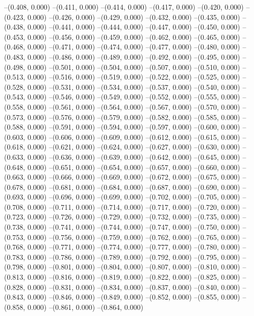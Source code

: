 {--(0.408, 0.000)
--(0.411, 0.000)
--(0.414, 0.000)
--(0.417, 0.000)
--(0.420, 0.000)
--(0.423, 0.000)
--(0.426, 0.000)
--(0.429, 0.000)
--(0.432, 0.000)
--(0.435, 0.000)
--(0.438, 0.000)
--(0.441, 0.000)
--(0.444, 0.000)
--(0.447, 0.000)
--(0.450, 0.000)
--(0.453, 0.000)
--(0.456, 0.000)
--(0.459, 0.000)
--(0.462, 0.000)
--(0.465, 0.000)
--(0.468, 0.000)
--(0.471, 0.000)
--(0.474, 0.000)
--(0.477, 0.000)
--(0.480, 0.000)
--(0.483, 0.000)
--(0.486, 0.000)
--(0.489, 0.000)
--(0.492, 0.000)
--(0.495, 0.000)
--(0.498, 0.000)
--(0.501, 0.000)
--(0.504, 0.000)
--(0.507, 0.000)
--(0.510, 0.000)
--(0.513, 0.000)
--(0.516, 0.000)
--(0.519, 0.000)
--(0.522, 0.000)
--(0.525, 0.000)
--(0.528, 0.000)
--(0.531, 0.000)
--(0.534, 0.000)
--(0.537, 0.000)
--(0.540, 0.000)
--(0.543, 0.000)
--(0.546, 0.000)
--(0.549, 0.000)
--(0.552, 0.000)
--(0.555, 0.000)
--(0.558, 0.000)
--(0.561, 0.000)
--(0.564, 0.000)
--(0.567, 0.000)
--(0.570, 0.000)
--(0.573, 0.000)
--(0.576, 0.000)
--(0.579, 0.000)
--(0.582, 0.000)
--(0.585, 0.000)
--(0.588, 0.000)
--(0.591, 0.000)
--(0.594, 0.000)
--(0.597, 0.000)
--(0.600, 0.000)
--(0.603, 0.000)
--(0.606, 0.000)
--(0.609, 0.000)
--(0.612, 0.000)
--(0.615, 0.000)
--(0.618, 0.000)
--(0.621, 0.000)
--(0.624, 0.000)
--(0.627, 0.000)
--(0.630, 0.000)
--(0.633, 0.000)
--(0.636, 0.000)
--(0.639, 0.000)
--(0.642, 0.000)
--(0.645, 0.000)
--(0.648, 0.000)
--(0.651, 0.000)
--(0.654, 0.000)
--(0.657, 0.000)
--(0.660, 0.000)
--(0.663, 0.000)
--(0.666, 0.000)
--(0.669, 0.000)
--(0.672, 0.000)
--(0.675, 0.000)
--(0.678, 0.000)
--(0.681, 0.000)
--(0.684, 0.000)
--(0.687, 0.000)
--(0.690, 0.000)
--(0.693, 0.000)
--(0.696, 0.000)
--(0.699, 0.000)
--(0.702, 0.000)
--(0.705, 0.000)
--(0.708, 0.000)
--(0.711, 0.000)
--(0.714, 0.000)
--(0.717, 0.000)
--(0.720, 0.000)
--(0.723, 0.000)
--(0.726, 0.000)
--(0.729, 0.000)
--(0.732, 0.000)
--(0.735, 0.000)
--(0.738, 0.000)
--(0.741, 0.000)
--(0.744, 0.000)
--(0.747, 0.000)
--(0.750, 0.000)
--(0.753, 0.000)
--(0.756, 0.000)
--(0.759, 0.000)
--(0.762, 0.000)
--(0.765, 0.000)
--(0.768, 0.000)
--(0.771, 0.000)
--(0.774, 0.000)
--(0.777, 0.000)
--(0.780, 0.000)
--(0.783, 0.000)
--(0.786, 0.000)
--(0.789, 0.000)
--(0.792, 0.000)
--(0.795, 0.000)
--(0.798, 0.000)
--(0.801, 0.000)
--(0.804, 0.000)
--(0.807, 0.000)
--(0.810, 0.000)
--(0.813, 0.000)
--(0.816, 0.000)
--(0.819, 0.000)
--(0.822, 0.000)
--(0.825, 0.000)
--(0.828, 0.000)
--(0.831, 0.000)
--(0.834, 0.000)
--(0.837, 0.000)
--(0.840, 0.000)
--(0.843, 0.000)
--(0.846, 0.000)
--(0.849, 0.000)
--(0.852, 0.000)
--(0.855, 0.000)
--(0.858, 0.000)
--(0.861, 0.000)
--(0.864, 0.000)
}
